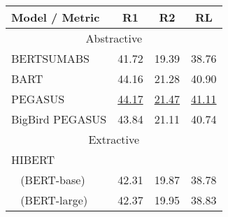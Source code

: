 \documentclass[11pt]{article}
\begin{document}
\begin{table}[ht]
\fontsize{9}{9}
\selectfont
\centering
        \begin{tabular}[t]{@{}llll@{}}
        \toprule
         Model  / Metric   & \multicolumn{1}{c}{R1} & \multicolumn{1}{c}{R2} & \multicolumn{1}{c}{RL} \\ \midrule
        \multicolumn{4}{c}{Abstractive}                 \\ \midrule
BERTSUMABS \citeyearpar{presumm}              & 41.72 & 19.39 & 38.76 \\
BART \citeyearpar{bart}                    & 44.16 & 21.28 & 40.90 \\
PEGASUS \citeyearpar{zhang2019pegasus}                 & \underline{44.17} & \underline{21.47} & \underline{41.11} \\
BigBird PEGASUS \citeyearpar{bigbird}         & 43.84 & 21.11 & 40.74 \\ \midrule
        \multicolumn{4}{c}{Extractive}                  \\ \midrule
HIBERT \citeyearpar{zhang-etal-2019-hibert}    &  &  & \\
~ (BERT-base)  & 42.31 & 19.87 & 38.78 \\
~ (BERT-large) & 42.37 & 19.95 & 38.83 \\


\end{tabular}
\end{table}
\end{document}
